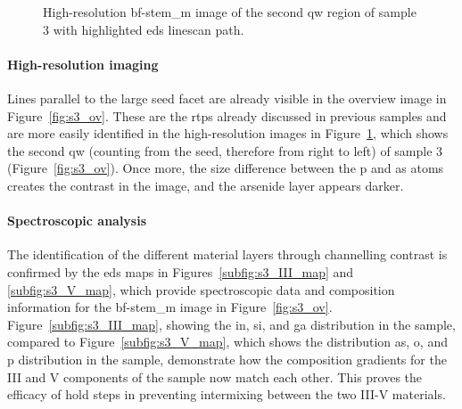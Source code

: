\begin{figure}
    \centering
    \caption[High-resolution \acs{bf}-\acs{stem_m} image of the second \acl{qw} region of sample 3.]{High-resolution \acs{bf}-\acs{stem_m} image of the second \acl{qw} region of sample 3 with highlighted \acs{eds} linescan path.}
    \label{fig:s3_QW_HR}
\end{figure}

\paragraph{High-resolution imaging} Lines parallel to the large  seed facet are already visible in the overview image in Figure~\ref{fig:s3_ov}. These are the \acl{rtp}s already discussed in previous samples and are more easily identified in the high-resolution images in Figure~\ref{fig:s3_QW_HR}, which shows the second \acl{qw} (counting from the seed, therefore from right to left) of sample 3 (Figure~\ref{fig:s3_ov}). Once more, the size difference between the \acl{p} and \acl{as} atoms creates the contrast in the image, and the arsenide layer appears darker.
\par

\paragraph{Spectroscopic analysis} The identification of the different material layers through channelling contrast is confirmed by the \acs{eds} maps in Figures~\ref{subfig:s3_III_map} and \ref{subfig:s3_V_map}, which provide spectroscopic data and composition information for the \acs{bf}-\acs{stem_m} image in Figure~\ref{fig:s3_ov}. Figure~\ref{subfig:s3_III_map}, showing the \acl{in}, \acl{si}, and \acl{ga} distribution in the sample, compared to Figure~\ref{subfig:s3_V_map}, which shows the distribution \acl{as}, \acl{o}, and \acl{p} distribution in the sample, demonstrate how the composition gradients for the III and V components of the sample now match each other. This proves the efficacy of hold steps in preventing intermixing between the two III-V materials.

